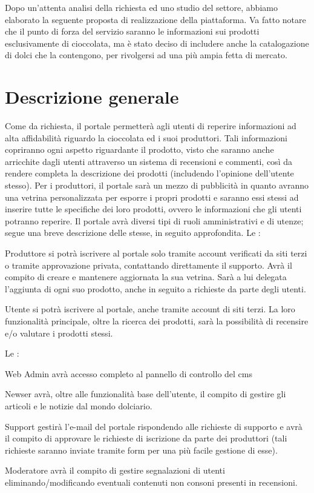 Dopo un’attenta analisi della richiesta ed uno studio del settore, abbiamo elaborato la seguente proposta di realizzazione della piattaforma. Va fatto notare che il punto di forza del servizio saranno le informazioni sui prodotti esclusivamente di cioccolata, ma è stato deciso di includere anche la catalogazione di dolci che la contengono, per rivolgersi ad una più ampia fetta di mercato.

\section{Descrizione generale}
Come da richiesta, il portale permetterà agli utenti di reperire informazioni ad alta affidabilità riguardo la cioccolata ed i suoi produttori.
Tali informazioni copriranno ogni aspetto riguardante il prodotto, visto che saranno anche arricchite dagli utenti attraverso un sistema di recensioni e commenti, così da rendere completa la descrizione dei prodotti (includendo l'opinione dell'utente stesso).
Per i produttori, il portale sarà un mezzo di pubblicità in quanto avranno una vetrina personalizzata per esporre i propri prodotti e saranno essi stessi ad inserire tutte le specifiche dei loro prodotti, ovvero le informazioni che gli utenti potranno reperire.
Il portale avrà diversi tipi di ruoli amministrativi e di utenze; segue una breve descrizione delle stesse, in seguito approfondita. 
Le :
\begin{descriptionInd}
	\item[Produttore] si potrà iscrivere al portale solo tramite account verificati da siti terzi o tramite approvazione privata, contattando direttamente il supporto. Avrà il compito di creare e mantenere aggiornata la sua vetrina. Sarà a lui delegata l’aggiunta di ogni suo prodotto, anche in seguito a richieste da parte degli utenti.
	
	\item[Utente] si potrà iscrivere al portale, anche tramite account di siti terzi. La loro funzionalità principale, oltre la ricerca dei prodotti, sarà la possibilità di recensire e/o valutare i prodotti stessi. 
\end{descriptionInd}
Le :
\begin{descriptionInd}
	\item[Web Admin] avrà accesso completo al pannello di controllo del \gls{cms}
	
	\item[Newser] avrà, oltre alle funzionalità base dell’utente, il compito di gestire gli articoli e le notizie dal mondo dolciario.
	
	\item[Support] gestirà l’e-mail del portale rispondendo alle richieste di supporto e avrà il compito di approvare le richieste di iscrizione da parte dei produttori (tali richieste saranno inviate tramite form per una più facile gestione di esse).
	
	\item[Moderatore] avrà il compito di gestire segnalazioni di utenti eliminando/modificando eventuali contenuti non consoni presenti in recensioni.
\end{descriptionInd}

